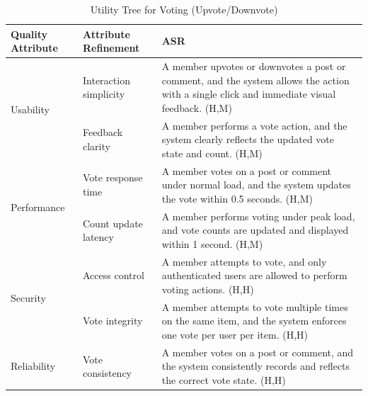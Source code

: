 \documentclass{article}
\begin{document}
\begin{table}[H]
    \centering
    \caption{Utility Tree for Voting (Upvote/Downvote)}
    \begin{tabular}{|p{3cm}|p{4cm}|p{7cm}|}
        \hline
        \textbf{Quality Attribute} & \textbf{Attribute Refinement}                                                                                                              & \textbf{ASR} \\
        \hline

        \multirow{2}{*}{Usability}
                                   & Interaction simplicity
                                   & A member upvotes or downvotes a post or comment, and the system allows the action with a single click and immediate visual feedback. (H,M)                \\
        \cline{2-3}
                                   & Feedback clarity
                                   & A member performs a vote action, and the system clearly reflects the updated vote state and count. (H,M)                                                  \\
        \hline

        \multirow{2}{*}{Performance}
                                   & Vote response time
                                   & A member votes on a post or comment under normal load, and the system updates the vote within 0.5 seconds. (H,M)                                          \\
        \cline{2-3}
                                   & Count update latency
                                   & A member performs voting under peak load, and vote counts are updated and displayed within 1 second. (H,M)                                                \\
        \hline

        \multirow{2}{*}{Security}
                                   & Access control
                                   & A member attempts to vote, and only authenticated users are allowed to perform voting actions. (H,H)                                                      \\
        \cline{2-3}
                                   & Vote integrity
                                   & A member attempts to vote multiple times on the same item, and the system enforces one vote per user per item. (H,H)                                      \\
        \hline

        Reliability
                                   & Vote consistency
                                   & A member votes on a post or comment, and the system consistently records and reflects the correct vote state. (H,H)                                       \\
        \hline


\end{tabular}
\end{table}
\end{document}

